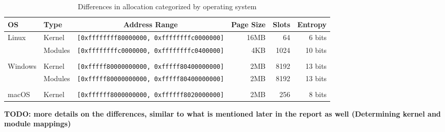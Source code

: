 \begin{table*}[!ht]
  \small
  \centering
  \begin{tabular}{llcrrr}
  \hline
    \textbf{OS} & \textbf{Type} & \textbf{Address Range} & \textbf{Page Size} & \textbf{Slots} & \textbf{Entropy} \\ \hline
    \multirow{2}{*}{Linux}   & Kernel  & {\lstinline[basicstyle=\ttfamily]![0xffffffff80000000, 0xffffffffc0000000]!} & 16MB &   64 &  6 bits \\
                             & Modules & {\lstinline[basicstyle=\ttfamily]![0xffffffffc0000000, 0xffffffffc0400000]!} &  4KB & 1024 & 10 bits \\ \\
    \multirow{2}{*}{Windows} & Kernel  & {\lstinline[basicstyle=\ttfamily]![0xfffff80000000000, 0xfffff80400000000]!} &  2MB & 8192 & 13 bits \\
                             & Modules & {\lstinline[basicstyle=\ttfamily]![0xfffff80000000000, 0xfffff80400000000]!} &  2MB & 8192 & 13 bits \\ \\
    macOS   & Kernel  & {\lstinline[basicstyle=\ttfamily]![0xffffff8000000000, 0xffffff8020000000]!} &  2MB &  256 &  8 bits \\ \hline
  \end{tabular}
  \caption{Differences in allocation categorized by operating system}
\end{table*}

\textbf{TODO: more details on the differences, similar to what is mentioned later in the report as well (Determining kernel and module mappings)}
